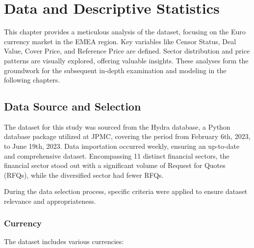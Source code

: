 \chapter{Data and Descriptive Statistics} \label{Chap3}
This chapter provides a meticulous analysis of the dataset, focusing on the Euro currency market in the EMEA region. Key variables like Censor Status, Deal Value, Cover Price, and Reference Price are defined. Sector distribution and price patterns are visually explored, offering valuable insights. These analyses form the groundwork for the subsequent in-depth examination and modeling in the following chapters.

\section{Data Source and Selection}
The dataset for this study was sourced from the Hydra database, a Python database package utilized at JPMC, covering the period from February 6th, 2023, to June 19th, 2023. Data importation occurred weekly, ensuring an up-to-date and comprehensive dataset. Encompassing 11 distinct financial sectors, the financial sector stood out with a significant volume of Request for Quotes (RFQs), while the diversified sector had fewer RFQs.

During the data selection process, specific criteria were applied to ensure dataset relevance and appropriateness.

\subsection{Currency}
The dataset includes various currencies:

